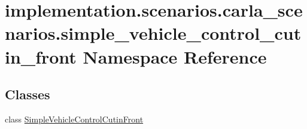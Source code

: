 \hypertarget{namespaceimplementation_1_1scenarios_1_1carla__scenarios_1_1simple__vehicle__control__cutin__front}{}\section{implementation.\+scenarios.\+carla\+\_\+scenarios.\+simple\+\_\+vehicle\+\_\+control\+\_\+cutin\+\_\+front Namespace Reference}
\label{namespaceimplementation_1_1scenarios_1_1carla__scenarios_1_1simple__vehicle__control__cutin__front}
\subsection*{Classes}
\begin{DoxyCompactItemize}
\item 
class \hyperlink{classimplementation_1_1scenarios_1_1carla__scenarios_1_1simple__vehicle__control__cutin__front_14eb2b3a85937f52b63b15ef53e9a1f6e}{Simple\+Vehicle\+Control\+Cutin\+Front}
\end{DoxyCompactItemize}
